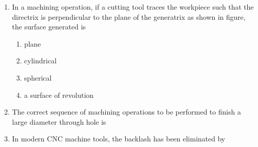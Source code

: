 \documentclass[journal,12pt,onecolumn]{IEEEtran}
\theoremstyle{remark}
\begin{document}
\begin{enumerate}
    \item In a machining operation, if a cutting tool traces the workpiece such that the directrix is
        perpendicular to the plane of the generatrix as shown in figure, the surface generated is 
        \begin{center}
            \resizebox{0.4\textwidth}{!}{
                
            } 
        \end{center}
        \hfill{}
        \begin{multicols}{4}
            \begin{enumerate}
                \item plane
                    \columnbreak
                \item cylindrical
                    \columnbreak
                \item spherical
                    \columnbreak
                \item a surface of revolution
            \end{enumerate}
        \end{multicols}


    \item The correct sequence of machining operations to be performed to finish a large diameter
        through hole is
        \hfill{}
            \begin{enumerate}
            \end{enumerate}

    \item In modern CNC machine tools, the backlash has been eliminated by
        \hfill{}
            \begin{enumerate}
            \end{enumerate}


\end{enumerate}
\end{document}
